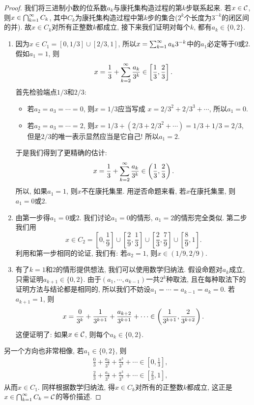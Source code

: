 \begin{proof}
    我们将三进制小数的位系数$a_k$与康托集构造过程的第$k$步联系起来. 若$x \in \mathcal{C}$, 则$x \in \bigcap_{k=1}^{\infty}C_k$, 其中$C_k$为康托集构造过程中第$k$步的集合($2^k$个长度为$3^{-k}$的闭区间的并). 故$x \in C_k$对所有正整数$k$都成立, 接下来我们证明对每个$k$, 都有$a_k \in \{0, 2\}$. 
    \begin{enumerate}
    \item 因为$x \in C_1 = [0,1/3] \cup [2/3, 1]$, 所以$x=\sum_{k=1}^{\infty}a_k3^{-k}$中的$a_1$必定等于$0$或$2$. 假如$a_1 = 1$, 则
    $$ x = \frac{1}{3} + \sum_{k=2}^{\infty}\frac{a_k}{3^k} \in 
    \left[\frac{1}{3}, \frac{2}{3}\right]. $$
    首先检验端点$1/3$和$2/3$:
    \begin{itemize}
        \item 若$a_2 = a_3 = \cdots = 0$, 则$x = 1/3$应当写成
        $x = 2/3^2 + 2/3^3 + \cdots$, 所以$a_1 = 0$.
        \item 若$a_2 = a_3 = \cdots = 2$, 则$x=1/3+(2/3+2/3^2+\cdots)=1/3+1/3=2/3$,
        但是$2/3$的唯一表示显然应当是它自己! 所以$a_1 = 2$. 
    \end{itemize}
    于是我们得到了更精确的估计:
    $$x = \frac{1}{3} + \sum_{k=2}^{\infty}\frac{a_k}{3^k} \in 
    \left(\frac{1}{3}, \frac{2}{3}\right).$$
    所以, 如果$a_1 = 1$, 则$x$不在康托集里. 用逆否命题来看, 若$x$在康托集里, 则$a_1 = 0$或$2$. 
    \item 由第一步得$a_1 = 0$或$2$. 我们讨论$a_1 = 0$的情形, $a_1 = 2$的情形完全类似. 
    第二步我们用
    $$x \in C_2 = \left[0, \frac{1}{9}\right] \cup \left[\frac{2}{9}, \frac{1}{3}\right] \cup \left[\frac{2}{3}, \frac{7}{9}\right] \cup \left[\frac{8}{9},1\right].$$
    利用和第一步相同的论证, 我们有: 若$a_2=1$, 则$x \in (1/9, 2/9)$. 
    \item 有了$k=1$和$2$的情形提供想法, 我们可以使用数学归纳法. 假设命题对$a_k$成立, 只需证明$a_{k+1} \in \{0, 2\}$. 由于$(a_1, \cdots, a_{k-1})$一共$2^{k}$种取法, 且在每种取法下的证明方法与结论都是相同的, 所以我们不妨设$a_1 = \cdots = a_{k-1} = a_k = 0$.
    若$a_{k+1} = 1$, 则
    $$x = \frac{0}{3^k} + \frac{1}{3^{k+1}} + \frac{a_{k+2}}{3^{k+1}} + \cdots \in \left( \frac{1}{3^{k+1}}, \frac{2}{3^{k+2}} \right). $$
    这便证明了: 如果$x \in \mathcal{C}$, 则每个$a_k \in \{0,2\}$. 
    \end{enumerate} 
    另一个方向也非常相像, 若$a_1 \in \{0, 2\}$, 则
    \begin{align*}
        &\frac{0}{3} + \frac{a_2}{3^2} + \frac{a^3}{3^3} + \cdots \in \left[0, \frac{1}{3}\right], \\
        &\frac{2}{3} + \frac{a_2}{3^2} + \frac{a^3}{3^3} + \cdots \in \left[\frac{2}{3}, 1\right],
    \end{align*}
    从而$x \in C_1$. 同样根据数学归纳法, 得$x \in C_k$对所有的正整数$k$都成立, 这正是
    $x \in \bigcap_{k=1}^{\infty}C_k = \mathcal{C}$的等价描述.
\end{proof}
